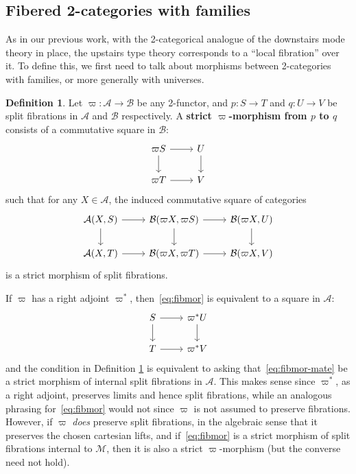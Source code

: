 \documentclass[10pt]{article}
\theoremstyle{definition}
\newtheorem{definition}{Definition}
\newcommand\M{\mathcal{M}}
\newcommand\vp{\varpi}
\newcommand\vpst{\vp^*}
\begin{document}
\subsection{Fibered 2-categories with families}
\label{sec:fib-2cwf}

As in our previous work, with the 2-categorical analogue of the downstairs mode theory in place, the upstairs type theory corresponds to a ``local fibration'' over it.
To define this, we first need to talk about morphisms between 2-categories with families, or more generally with universes.

\begin{definition}\label{defn:fibmor}
  Let $\vp : \mathcal{A}\to \mathcal{B}$ be any 2-functor, and $p:S\to T$ and $q:U\to V$ be split fibrations in $\mathcal{A}$ and $\mathcal{B}$ respectively.
  A \textbf{strict $\vp$-morphism from $p$ to $q$} consists of a commutative square in $\mathcal{B}$:
  \begin{equation}\label{eq:fibmor}
    \begin{tikzcd}
      \vp S \ar[r] \ar[d] & U\ar[d]\\
      \vp T \ar[r] & V
    \end{tikzcd}
  \end{equation}
  such that for any $X\in \mathcal{A}$, the induced commutative square of categories
  \begin{equation}\label{eq:fibmor2}
    \begin{tikzcd}
      \mathcal{A}(X,S) \ar[r] \ar[d] & \mathcal{B}(\vp X, \vp S) \ar[r] \ar[d] & \mathcal{B}(\vp X, U) \ar[d] \\
      \mathcal{A}(X,T) \ar[r] & \mathcal{B}(\vp X, \vp T) \ar[r] & \mathcal{B}(\vp X, V)
    \end{tikzcd}
  \end{equation}
  is a strict morphism of split fibrations.
\end{definition}

If $\vp$ has a right adjoint $\vpst$, then~\eqref{eq:fibmor} is equivalent to a square in $\mathcal{A}$:
\begin{equation}\label{eq:fibmor-mate}
  \begin{tikzcd}
    S \ar[r] \ar[d] & \vpst U\ar[d]\\
    T \ar[r] & \vpst V
  \end{tikzcd}
\end{equation}
and the condition in Definition \ref{defn:fibmor} is equivalent to asking that~\eqref{eq:fibmor-mate} be a strict morphism of internal split fibrations in $\mathcal{A}$.
This makes sense since $\vpst$, as a right adjoint, preserves limits and hence split fibrations, while an analogous phrasing for~\eqref{eq:fibmor} would not since $\vp$ is not assumed to preserve fibrations.
However, if $\vp$ \emph{does} preserve split fibrations, in the algebraic sense that it preserves the chosen cartesian lifts, and if~\eqref{eq:fibmor} is a strict morphism of split fibrations internal to $\M$, then it is also a strict $\vp$-morphism (but the converse need not hold).
\end{document}
